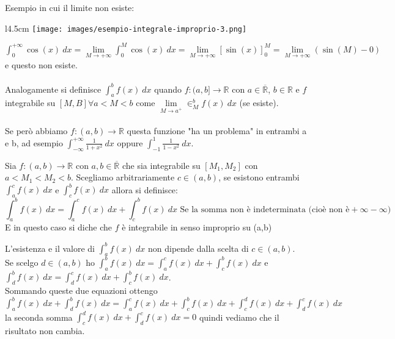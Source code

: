 \begin{example}
Esempio in cui il limite non esiste: 
\end{example}
\begin{wrapfigure}[2]{l}{4.5cm}
    \vspace{-25pt}
    \centering
    \texttt{[image: images/esempio-integrale-improprio-3.png]}
\end{wrapfigure}
$\int_0^{+\infty}\cos(x)\:dx = \lim\limits_{M\to +\infty}\int_0^M\cos(x)\:dx = \lim\limits_{M\to +\infty}[\sin(x)]_0^M = \lim\limits_{M\to +\infty}(\sin(M)-0)$ e questo non esiste.\\\\

\hspace{-15pt}Analogamente si definisce $\int_a^b f(x)\:dx$ quando $f:(a,b] \to \mathbb{R}$ con $a \in \mathbb{\overline{R}}$, $b\in \mathbb{R}$ e $f$ integrabile su $[M,B] \forall a < M < b$ come $\lim\limits_{M\to a^+}\in_M^b f(x) \:dx$ (se esiste).\\\\
Se però abbiamo $f:(a,b)\to \mathbb{R}$ questa funzione "ha un problema" in entrambi a e b, ad esempio $\int_{-\infty}^{+\infty}\frac{1}{1+x^2}\:dx$ oppure $\int_{-1}^1 \frac{1}{1-x^2}\:dx$.

\begin{definition}
Sia $f: (a,b)\to \mathbb{R}$ con $a,b \in \mathbb{\overline{R}}$ che sia integrabile su $[M_1,M_2]$ con $a<M_1<M_2<b$. Scegliamo arbitrariamente $c\in (a,b)$, se esistono entrambi $\int_a^c f(x)\:dx$ e $\int_c^b f(x)\:dx$ allora si definisce:
\[\int_a^b f(x)\:dx = \int_a^c f(x)\:dx + \int_c^b f(x)\:dx \text{ Se la somma non è indeterminata (cioè non è} +\infty-\infty)\]
E in questo caso si diche che $f$ è integrabile in senso improprio su (a,b)
\end{definition}

\begin{observation}
L'esistenza e il valore di $\int_a^b f(x) \:dx$ non dipende dalla scelta di $c\in (a,b)$.\\
Se scelgo $d\in (a,b)$ ho $\int_a^b f(x)\:dx = \int_a^c f(x)\:dx + \int_c^b f(x)\:dx$ e $\int_d^b f(x)\:dx = \int_d^c f(x)\:dx + \int_c^b f(x)\:dx$.\\
Sommando queste due equazioni ottengo $\int_a^b f(x)\:dx + \int_d^b f(x)\:dx = \int_a^c f(x)\:dx + \int_c^b f(x)\:dx + \int_c^d f(x)\:dx + \int_d^c f(x)\:dx$ la seconda somma $\int_c^d f(x)\:dx + \int_d^c f(x)\:dx = 0$ quindi vediamo che il risultato non cambia.
\end{observation}

